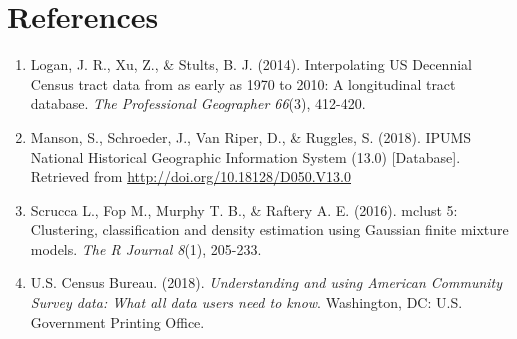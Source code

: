 \documentclass[paper=letterpaper, fontsize=11pt]{scrartcl}
\begin{document}
\section{References}
\begin{enumerate}
	\item Logan, J. R., Xu, Z., \& Stults, B. J. (2014). Interpolating US Decennial Census tract data from as early as 1970 to 2010: A longitudinal tract database. \textit{The Professional Geographer 66}(3), 412-420.
	\item Manson, S., Schroeder, J., Van Riper, D., \& Ruggles, S. (2018). IPUMS National Historical Geographic Information System (13.0) [Database]. Retrieved from \href{http://doi.org/10.18128/D050.V13.0}{http://doi.org/10.18128/D050.V13.0}
	\item Scrucca L., Fop M., Murphy T. B., \& Raftery A. E. (2016). mclust 5: Clustering, classification and density estimation using Gaussian
	finite mixture models. \textit{The R Journal 8}(1), 205-233.
	\item U.S. Census Bureau. (2018). \textit{Understanding and using American Community Survey data: What all data users need to know}. Washington, DC: U.S. Government Printing Office.
\end{enumerate}
\end{document}
